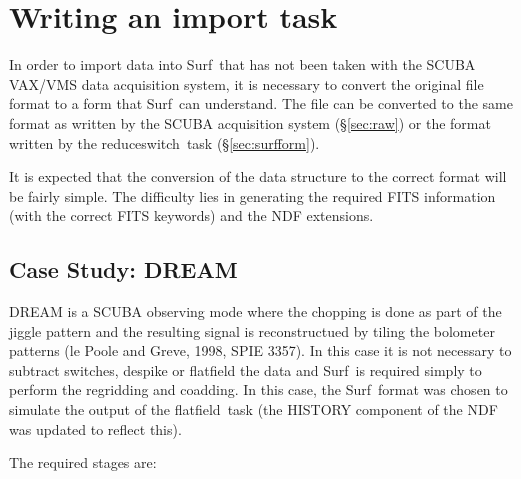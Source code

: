 \documentclass[twoside,11pt]{article}
\newcommand{\task}[1]{{\sf #1}}
\newcommand{\resw}{\xref{\task{reduce\_switch}}{sun216}{REDUCE_SWITCH}}
\newcommand{\flatf}{\xref{\task{flatfield}}{sun216}{FLATFIELD}}
\newcommand{\scusoft}          {{\sc Surf}}
\newcommand{\xref}[3]{#1}
\renewcommand{\_}{\texttt{\symbol{95}}}
\begin{document}
\section{Writing an import task}

In order to import data into \scusoft\ that has not been taken with the
SCUBA VAX/VMS data acquisition system, it is necessary to convert the
original file format to a form that \scusoft\ can understand.
The file can be converted to the same format as written by the SCUBA
acquisition system (\S\ref{sec:raw}) or the format written by the
\resw\ task (\S\ref{sec:surfform}).

It is expected that the conversion of the data structure to the correct format
will be fairly simple. The difficulty lies in generating the required FITS
information (with the correct FITS keywords) and the NDF extensions.

\subsection{Case Study: DREAM}

DREAM is a SCUBA observing mode where the chopping is done as part of the
jiggle pattern and the resulting signal is reconstructued by tiling the
bolometer patterns (le Poole and Greve, 1998, SPIE 3357). In this case
it is not necessary to subtract switches, despike or flatfield the data and
\scusoft\ is required simply to perform the regridding and coadding.
In this case, the \scusoft\ format was chosen to simulate the output of the
\flatf\ task (the HISTORY component of the NDF was updated to reflect this).

The required stages are:
\end{document}
